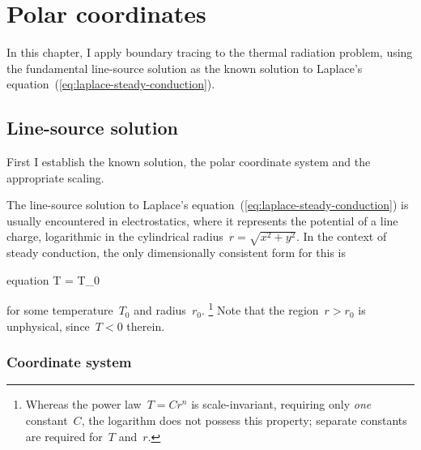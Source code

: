 \chapter{Polar coordinates}
\label{ch:polar}

In this chapter, I apply boundary tracing to the thermal radiation problem,
using the fundamental line-source solution
as the known solution to
Laplace's equation~(\ref{eq:laplace-steady-conduction}).

\section{Line-source solution}
\label{sec:polar.line}

First I establish the known solution, the polar coordinate system
and the appropriate scaling.

The line-source solution
to Laplace's equation~(\ref{eq:laplace-steady-conduction})
is usually encountered in electrostatics,
where it represents the potential of a line charge,
logarithmic in the cylindrical radius~$r = \sqrt{x^2 + y^2}$.
In the context of steady conduction,
the only dimensionally consistent form for this is
\begin{important}{equation}
  T = T_0 \log {}
  \label{eq:line-laplace-solution}
\end{important}
for some temperature~$T_0$ and radius~$r_0$.%
\footnote{
  Whereas the power law~$T = C r^n$ is scale-invariant,
  requiring only \emph{one} constant~$C$,
  the logarithm does not possess this property;
  separate constants are required for~$T$ and~$r$.
}
Note that the region~$r > r_0$ is unphysical,
since~$T < 0$ therein.

\subsection{Coordinate system}
\label{sec:polar.line.coordinate}

